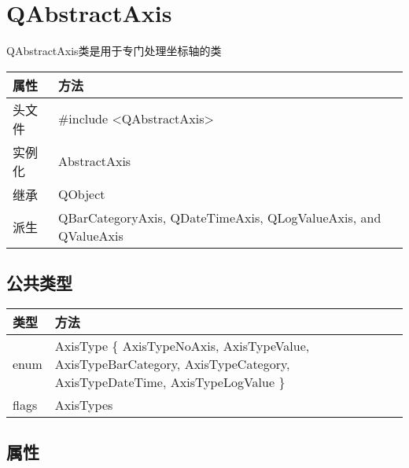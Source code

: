 \chapter{QAbstractAxis}

QAbstractAxis类是用于专门处理坐标轴的类

\begin{longtable}{|l|l|}
\hline
属性 & 方法 \\
\hline
头文件 & \#include <QAbstractAxis>\\      
\hline
实例化 & AbstractAxis\\      
\hline
继承&QObject \\
\hline
派生 & QBarCategoryAxis, QDateTimeAxis, QLogValueAxis, and QValueAxis \\
\hline
\end{longtable}

\splitLine

\section{公共类型}

\begin{longtable}{|l|p{6in}|}
\hline
类型 & 方法 \\
\hline
enum & AxisType \{ AxisTypeNoAxis, AxisTypeValue, AxisTypeBarCategory, AxisTypeCategory, AxisTypeDateTime, AxisTypeLogValue \}\\
\hline
flags &	AxisTypes\\
\hline
\end{longtable}

\section{属性}

